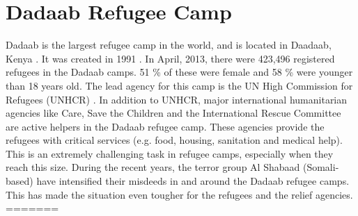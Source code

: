 \section{Dadaab Refugee Camp}
Dadaab is the largest refugee camp in the world, and is located in Daadaab, Kenya \cite{dadaab}. It was created in 1991 \cite{dadaabcare}. In April, 2013, there were 423,496 registered refugees in the Dadaab camps. 51 \% of these were female and 58 \% were younger than 18 years old. The lead agency for this camp is the UN High Commission for Refugees (UNHCR) \cite{dadaab}. In addition to UNHCR, major international humanitarian agencies like Care, Save the Children and the International Rescue Committee  are active helpers in the Dadaab refugee camp. These agencies provide the refugees with critical services (e.g. food, housing, sanitation and medical help). This is an extremely challenging task in refugee camps, especially when they reach this size. During the recent years, the terror group Al Shabaad (Somali-based) have intensified their misdeeds in and around the Dadaab refugee camps. This has made the situation even tougher for the refugees and the relief agencies. 
=======
